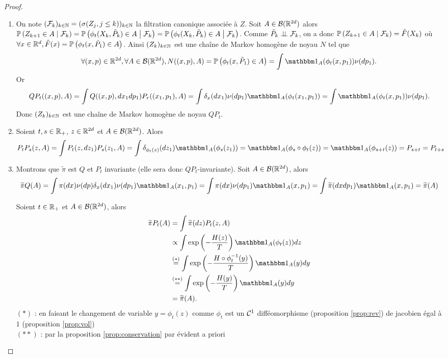 \documentclass[10pt,a4paper]{article}
\newcommand{\red}{\color{red}}
\begin{document}
\begin{proof}
	\begin{enumerate}
		\item On note $(\mathcal{F}_k)_{k \in \mathbb{N}} = (\sigma(Z_j, j\leq k))_{k \in \mathbb{N}}$ la filtration canonique associée à $Z$. Soit $A \in \mathcal{B}(\mathbb{R}^{2d})$ alors $\PP[Z_{k+1} \in A \given{\calF_k}] = \PP[\phi_t(X_k, \tilde{P}_k) \in A \given{\calF_k}] = \PP[\phi_t(X_k, \tilde{P}_k) \in A \given{\calF_k}]$. Comme $\tilde{P}_k \perp\!\!\!\perp \mathcal{F}_k$, on a donc $\PP[Z_{k+1} \in A \given{\calF_k}] = \hat{F}(X_k)$ où $\forall x \in \rset^d, \hat{F}(x) = \PP[\phi_t(x, \tilde{P}_1) \in A]$. Ainsi $(Z_k)_{k \in \mathbb{N}}$ est une chaîne de Markov homogène de noyau $N$ tel que
		$$
		\forall (x,p) \in \rset^{2d}, \forall A \in \calB(\rset^{2d}), N((x,p), A) = \PP[\phi_t(x, \tilde{P}_1) \in A] = \int \ind_A(\phi_t(x, p_1)) \nu(dp_1).
		$$
		Or
		$$
		Q P_t((x,p),A) = \int Q((x,p), dx_1dp_1) P_r((x_1, p_1), A) = \int \delta_x(dx_1) \nu(dp_1) \ind_A(\phi_t(x_1, p_1)) = \int \ind_A(\phi_t(x,p_1)) \nu(dp_1).
		$$
		Donc $(Z_k)_{k \in \mathbb{N}}$ est une chaîne de Markov homogène de noyau $QP_t$.

		\item Soient $t,s \in \mathbb{R}_+$, $z \in \mathbb{R}^{2d}$ et $A \in \mathcal{B}(\mathbb{R}^{2d})$. Alors
		$$
		P_t P_s (z, A) = \int P_t(z, dz_1) P_s(z_1, A) = \int \delta_{\phi_t(z)}(dz_1) \ind_A(\phi_s(z_1)) = \ind_A(\phi_s \circ \phi_t(z)) = \ind_A(\phi_{s+t}(z)) = P_{s+t} = P_{t+s}
		$$

		\item Montrons que $\widetilde{\pi}$ est $Q$ et $P_t$ invariante (elle sera donc $QP_t$-invariante). Soit $A \in \mathcal{B}(\mathbb{R}^{2d})$, alors
		$$
		\widetilde{\pi} Q (A) = \int \pi(dx) \nu(dp) \delta_x(dx_1) \nu(dp_1) \ind_A(x_1, p_1) = \int \pi(dx) \nu(dp_1) \ind_A(x, p_1) = \int \widetilde{\pi}(dxdp_1) \ind_A(x, p_1) = \widetilde{\pi}(A) 
		$$

		Soient $t \in \mathbb{R}_+$ et $A \in \mathcal{B}(\mathbb{R}^{2d})$, alors
		\begin{align*}
		\widetilde{\pi} P_t (A)
		&= \int \widetilde{\pi}(dz) P_t(z, A) \\
		&\propto \int \exp \left(-\frac{H(z)}{T} \right) \ind_A(\phi_t(z)) dz\\
		&\overset{(*)}{=} \int \exp \left(-\frac{H \circ \phi_t^{-1}(y)}{T} \right) \ind_A(y) dy \\
		&\overset{(**)}{=} \int \exp \left(-\frac{H(y)}{T} \right) \ind_A(y) dy \\
		&= \widetilde{\pi}(A).
		\end{align*}
		$(*)$ : en faisant le changement de variable $y = \phi_t(z)$ comme $\phi_t$ est un $\mathcal{C}^1$ difféomorphisme (proposition \ref{prop:rev}) de jacobien égal à $1$ (proposition \ref{prop:vol}) \\
		$(**)$ : par la proposition \ref{prop:conservation} {\red par évident a priori}
	\end{enumerate}
\end{proof}
\end{document}

